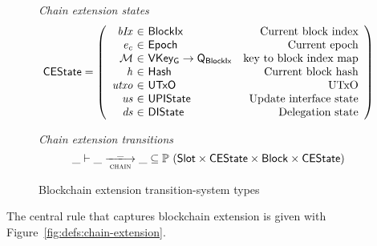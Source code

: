 \documentclass[11pt,a4paper]{article}
\newcommand{\powerset}[1]{\mathbb{P}~#1}
\newcommand{\var}[1]{\mathit{#1}}
\newcommand{\type}[1]{\mathsf{#1}}
\newcommand{\trans}[2]{\xlongrightarrow[\textsc{#1}]{#2}}
\newcommand{\totalf}{\to}
\newcommand{\Hash}{\type{Hash}}  %
\newcommand{\Slot}{\type{Slot}}
\newcommand{\BlockIx}{\type{BlockIx}}
\newcommand{\Block}{\type{Block}}
\newcommand{\Queue}{\type{Q}}
\newcommand{\VKeyGen}{\type{VKey_G}}
\newcommand{\signmapname}{\mathcal{M}}
\begin{document}
\begin{figure}[ht]
  \emph{Chain extension states}
  \begin{equation*}
    \CEState =
    \left(
      \begin{array}{r@{~\in~}lr}
        \var{bIx} & \BlockIx & \text{Current block index} \\
        \var{e_c} & \Epoch & \text{Current epoch} \\
        \signmapname & \VKeyGen \totalf \Queue_\BlockIx & \text{key to block index map} \\
        \var{h} & \Hash & \text{Current block hash} \\
        \var{utxo} & \UTxO & \text{UTxO} \\
        \var{us} & \UPIState & \text{Update interface state} \\
        \var{ds} & \DIState & \text{Delegation state}
      \end{array}
    \right)
  \end{equation*}

  \emph{Chain extension transitions}
  \begin{equation*}
    \_ \vdash \var{\_} \trans{chain}{\_} \var{\_} \subseteq
    \powerset (\Slot \times \CEState \times \Block \times \CEState)
  \end{equation*}

  \caption{Blockchain extension transition-system types}
  \label{fig:ts-types:chain-extension}
\end{figure}

The central rule that captures blockchain extension is given with
Figure~\ref{fig:defs:chain-extension}.
\end{document}
